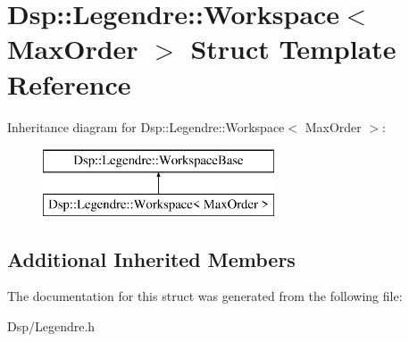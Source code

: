 \hypertarget{structDsp_1_1Legendre_1_1Workspace}{\section{Dsp\-:\-:Legendre\-:\-:Workspace$<$ Max\-Order $>$ Struct Template Reference}
\label{structDsp_1_1Legendre_1_1Workspace}
}
Inheritance diagram for Dsp\-:\-:Legendre\-:\-:Workspace$<$ Max\-Order $>$\-:\begin{figure}[H]
\begin{center}
\leavevmode
\includegraphics[height=2.000000cm]{structDsp_1_1Legendre_1_1Workspace}
\end{center}
\end{figure}
\subsection*{Additional Inherited Members}


The documentation for this struct was generated from the following file\-:\begin{DoxyCompactItemize}
\item 
Dsp/Legendre.\-h\end{DoxyCompactItemize}
